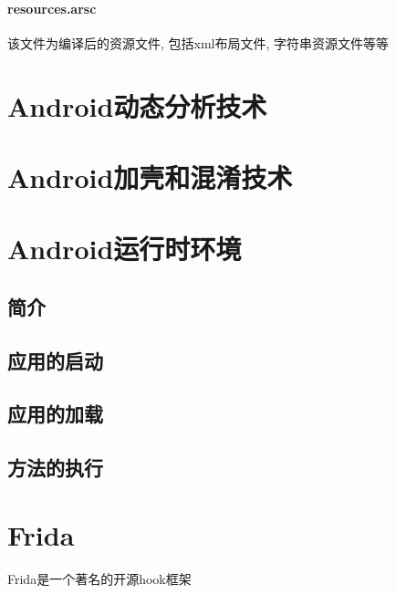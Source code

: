 \paragraph*{resources.arsc}
该文件为编译后的资源文件, 包括xml布局文件, 字符串资源文件等等\juhao


\section{Android动态分析技术}


\section{Android加壳和混淆技术}
\section{Android运行时环境}
\subsection{简介}
\subsection{应用的启动}
\subsection{应用的加载}
\subsection{方法的执行}
\section{Frida}
Frida是一个著名的开源hook框架\juhao

